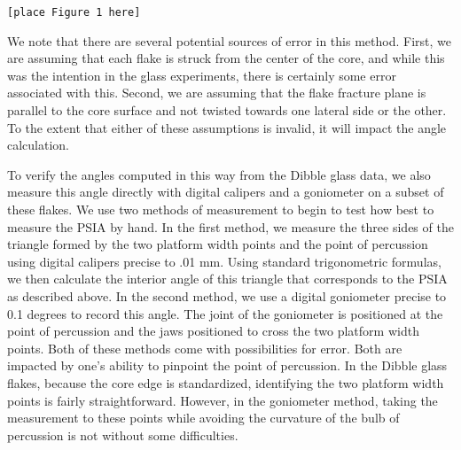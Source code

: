 \documentclass[10pt,letterpaper]{article}
\begin{document}
\begin{verbatim}
[place Figure 1 here]
\end{verbatim}

We note that there are several potential sources of error in this
method. First, we are assuming that each flake is struck from the center
of the core, and while this was the intention in the glass experiments,
there is certainly some error associated with this. Second, we are
assuming that the flake fracture plane is parallel to the core surface
and not twisted towards one lateral side or the other. To the extent
that either of these assumptions is invalid, it will impact the angle
calculation.

To verify the angles computed in this way from the Dibble glass data, we
also measure this angle directly with digital calipers and a goniometer
on a subset of these flakes. We use two methods of measurement to begin
to test how best to measure the PSIA by hand. In the first method, we
measure the three sides of the triangle formed by the two platform width
points and the point of percussion using digital calipers precise to .01
mm. Using standard trigonometric formulas, we then calculate the
interior angle of this triangle that corresponds to the PSIA as
described above. In the second method, we use a digital goniometer
precise to 0.1 degrees to record this angle. The joint of the goniometer
is positioned at the point of percussion and the jaws positioned to
cross the two platform width points. Both of these methods come with
possibilities for error. Both are impacted by one's ability to pinpoint
the point of percussion. In the Dibble glass flakes, because the core
edge is standardized, identifying the two platform width points is
fairly straightforward. However, in the goniometer method, taking the
measurement to these points while avoiding the curvature of the bulb of
percussion is not without some difficulties.
\end{document}
